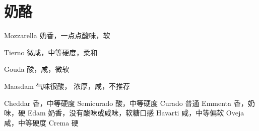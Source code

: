 \section{奶酪}
Mozzarella
奶香，一点点酸味，软

Tierno
微咸，中等硬度，柔和

Gouda
酸，咸，微软

Maasdam
气味很酸， 浓厚，咸，不推荐

Cheddar
香，中等硬度
Semicurado
酸，中等硬度
Curado
普通
Emmenta
香，奶味，硬
Edam
奶香，没有酸味或咸味，软糖口感
Havarti
咸，中等偏软
Oveja
咸，中等硬度
Crema
硬
